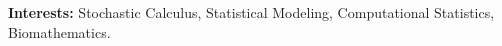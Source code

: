 \documentclass[9pt, letterpaper]{article}
\newcommand{\LastName}{Vasquez Martinez}
\newcommand{\Initials}{R}
\newcommand{\Me}{\textbf{\LastName, \Initials}}  %
\newcommand{\DOI}[1]{doi:\href{https://doi.org/#1}{#1}}
\newcommand{\GitHub}[1]{\faGithub\ \href{https://github.com/#1}{github.com/#1}}
\newcommand{\OA}{\aiOpenAccess}
\newcommand{\Year}[1]{\fontsize{9pt}{0}\selectfont #1}
\begin{document}
\textbf{Interests:} Stochastic Calculus, Statistical Modeling, Computational Statistics, Biomathematics.   
\end{document}
